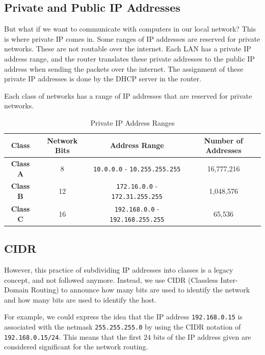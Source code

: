\subsection{Private and Public IP Addresses}

But what if we want to communicate with computers
in our local network? This is where private IP
comes in. Some ranges of IP addresses are reserved
for private networks. These are not routable over
the internet. Each LAN has a private IP address
range, and the router translates these private
addresses to the public IP address when sending
the packets over the internet. The assignment
of these private IP addresses is done by the
DHCP server
in the router.

Each class of networks has a range of IP addresses
that are reserved for private networks.

\begin{table}[h!]
\caption{Private IP Address Ranges}
\begin{tabular}{c c c c}
\toprule
Class & Network Bits & Address Range & Number of Addresses \\
\midrule
\textbf{Class A} & 8 & \lstinline|10.0.0.0| - \lstinline|10.255.255.255| & 16,777,216 \\
\textbf{Class B} & 12 & \lstinline|172.16.0.0| - \lstinline|172.31.255.255| & 1,048,576 \\
\textbf{Class C} & 16 & \lstinline|192.168.0.0| - \lstinline|192.168.255.255| & 65,536 \\
\bottomrule
\end{tabular}
\end{table}

\subsection{CIDR}

However, this practice of subdividing IP addresses
into classes is a legacy concept, and not followed
anymore. Instead, we use CIDR (Classless Inter-Domain
Routing) to announce how many bits are used to identify
the network and how many bits are used to identify the
host.

For example, we could express the idea that the IP address
\lstinline|192.168.0.15| is associated with the netmask
\lstinline|255.255.255.0| by using the CIDR notation of
\lstinline|192.168.0.15/24|. This means that the first
$24$ bits of the IP address given are considered
significant for the network routing.

